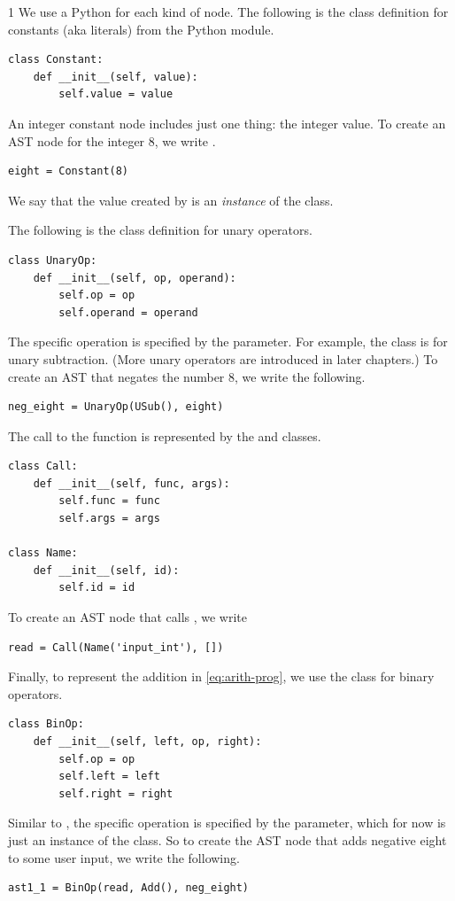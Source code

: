 \documentclass[7x10]{TimesAPriori_MIT}%
\def\pythonEd{1}
\def\edition{1}
\newcommand{\pythonColor}[0]{}
\numberwithin{theorem}{chapter}
\numberwithin{definition}{chapter}
\numberwithin{equation}{chapter}
\begin{document}
{\if\edition\pythonEd\pythonColor
We use a Python  for each kind of node.
The following is the class definition for
constants (aka literals)
from the Python  module.
\begin{lstlisting}
class Constant:
    def __init__(self, value):
        self.value = value
\end{lstlisting}
An integer constant node includes just one thing: the integer value.
To create an AST node for the integer $8$, we write .
\begin{lstlisting}
eight = Constant(8)
\end{lstlisting}
We say that the value created by  is an
\emph{instance} of the  class.

The following is the class definition for unary operators.
\begin{lstlisting}
class UnaryOp:
    def __init__(self, op, operand):
        self.op = op
        self.operand = operand
\end{lstlisting}
The specific operation is specified by the  parameter.  For
example, the class  is for unary subtraction.
(More unary operators are introduced in later chapters.) To create an AST that
negates the number $8$, we write the following.
\begin{lstlisting}
neg_eight = UnaryOp(USub(), eight)
\end{lstlisting}

The call to the  function is represented by the
 and  classes.
\begin{lstlisting}
class Call:
    def __init__(self, func, args):
        self.func = func
        self.args = args

class Name:
    def __init__(self, id):        
        self.id = id
\end{lstlisting}
To create an AST node that calls , we write
\begin{lstlisting}
read = Call(Name('input_int'), [])
\end{lstlisting}

Finally, to represent the addition in \eqref{eq:arith-prog}, we use
the  class for binary operators.
\begin{lstlisting}
class BinOp:
    def __init__(self, left, op, right):
        self.op = op
        self.left = left
        self.right = right
\end{lstlisting}
Similar to , the specific operation is specified by the
 parameter, which for now is just an instance of the
 class. So to create the AST
node that adds negative eight to some user input, we write the following.
\begin{lstlisting}
ast1_1 = BinOp(read, Add(), neg_eight)
\end{lstlisting}
\fi}
\end{document}
